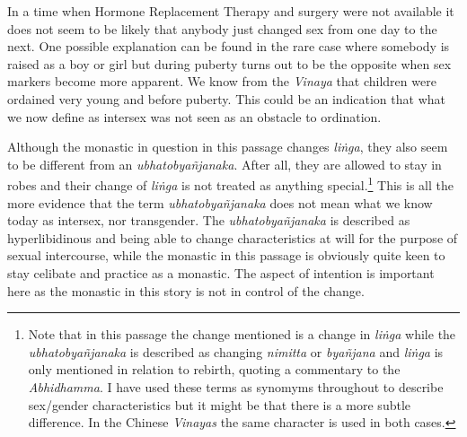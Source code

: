 In a time when Hormone Replacement Therapy and surgery were not available it does not seem to be likely that anybody just changed sex from one day to the next. One possible explanation can be found in the rare case where somebody is raised as a boy or girl but during puberty turns out to be the opposite when sex markers become more apparent. We know from the \textit{Vinaya} that children were ordained very young and before puberty. This could be an indication that what we now define as intersex was not seen as an obstacle to ordination. 

Although the monastic in question in this passage changes \textit{liṅga}, they also seem to be different from an \textit{ubhatob­yañ­janaka}. After all, they are allowed to stay in robes and their change of \textit{liṅga} is not treated as anything special.\footnote{Note that in this passage the change mentioned is a change in \textit{liṅga} while the \textit{ubhatob­yañ­janaka} is described as changing \textit{nimitta} or \textit{byañjana} and \textit{liṅga} is only mentioned in relation to rebirth, quoting a commentary to the \textit{Abhidhamma}. I have used these terms as synomyms throughout to describe sex/gender characteristics but it might be that there is a more subtle difference. In the Chinese \textit{Vinayas} the same character is used in both cases.} This is all the more evidence that the term \textit{ubhatob­yañ­janaka} does not mean what we know today as intersex, nor transgender. The \textit{ubhatob­yañ­janaka} is described as hyperlibidinous and being able to change characteristics at will for the purpose of sexual intercourse, while the monastic in this passage is obviously quite keen to stay celibate and practice as a monastic. The aspect of intention is important here as the monastic in this story is not in control of the change.